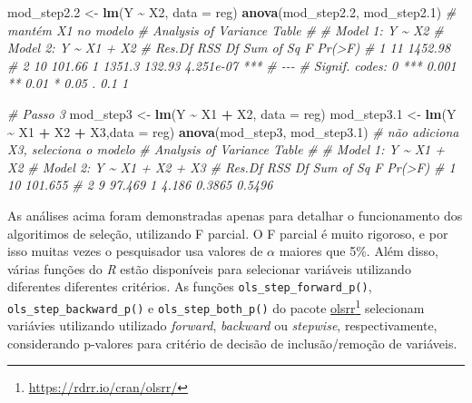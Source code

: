 \documentclass[
]{book}
\newenvironment{Shaded}{\begin{snugshade}}{\end{snugshade}}
\newcommand{\CommentTok}[1]{\textcolor[rgb]{0.56,0.35,0.01}{\textit{#1}}}
\newcommand{\DataTypeTok}[1]{\textcolor[rgb]{0.13,0.29,0.53}{#1}}
\newcommand{\FloatTok}[1]{\textcolor[rgb]{0.00,0.00,0.81}{#1}}
\newcommand{\KeywordTok}[1]{\textcolor[rgb]{0.13,0.29,0.53}{\textbf{#1}}}
\newcommand{\NormalTok}[1]{#1}
\newcommand{\OperatorTok}[1]{\textcolor[rgb]{0.81,0.36,0.00}{\textbf{#1}}}
\newcommand{\StringTok}[1]{\textcolor[rgb]{0.31,0.60,0.02}{#1}}
\numberwithin{equation}{section}
\begin{document}
\begin{Shaded}
\begin{Highlighting}[]
\NormalTok{mod\_step2}\FloatTok{.2}\NormalTok{ \textless{}{-}}\StringTok{ }\KeywordTok{lm}\NormalTok{(Y }\OperatorTok{\textasciitilde{}}\StringTok{ }\NormalTok{X2, }\DataTypeTok{data =}\NormalTok{ reg)}
\KeywordTok{anova}\NormalTok{(mod\_step2}\FloatTok{.2}\NormalTok{, mod\_step2}\FloatTok{.1}\NormalTok{) }\CommentTok{\# mantém X1 no modelo}
\CommentTok{\# Analysis of Variance Table}
\CommentTok{\# }
\CommentTok{\# Model 1: Y \textasciitilde{} X2}
\CommentTok{\# Model 2: Y \textasciitilde{} X1 + X2}
\CommentTok{\#   Res.Df     RSS Df Sum of Sq      F    Pr(\textgreater{}F)    }
\CommentTok{\# 1     11 1452.98                                  }
\CommentTok{\# 2     10  101.66  1    1351.3 132.93 4.251e{-}07 ***}
\CommentTok{\# {-}{-}{-}}
\CommentTok{\# Signif. codes:  0 \textquotesingle{}***\textquotesingle{} 0.001 \textquotesingle{}**\textquotesingle{} 0.01 \textquotesingle{}*\textquotesingle{} 0.05 \textquotesingle{}.\textquotesingle{} 0.1 \textquotesingle{} \textquotesingle{} 1}

\CommentTok{\# Passo 3}
\NormalTok{mod\_step3 \textless{}{-}}\StringTok{ }\KeywordTok{lm}\NormalTok{(Y }\OperatorTok{\textasciitilde{}}\StringTok{ }\NormalTok{X1 }\OperatorTok{+}\StringTok{ }\NormalTok{X2, }\DataTypeTok{data =}\NormalTok{ reg)}
\NormalTok{mod\_step3}\FloatTok{.1}\NormalTok{ \textless{}{-}}\StringTok{ }\KeywordTok{lm}\NormalTok{(Y }\OperatorTok{\textasciitilde{}}\StringTok{ }\NormalTok{X1 }\OperatorTok{+}\StringTok{ }\NormalTok{X2 }\OperatorTok{+}\StringTok{ }\NormalTok{X3,}\DataTypeTok{data =}\NormalTok{ reg)}
\KeywordTok{anova}\NormalTok{(mod\_step3, mod\_step3}\FloatTok{.1}\NormalTok{) }\CommentTok{\# não adiciona X3, seleciona o modelo}
\CommentTok{\# Analysis of Variance Table}
\CommentTok{\# }
\CommentTok{\# Model 1: Y \textasciitilde{} X1 + X2}
\CommentTok{\# Model 2: Y \textasciitilde{} X1 + X2 + X3}
\CommentTok{\#   Res.Df     RSS Df Sum of Sq      F Pr(\textgreater{}F)}
\CommentTok{\# 1     10 101.655                           }
\CommentTok{\# 2      9  97.469  1     4.186 0.3865 0.5496}
\end{Highlighting}
\end{Shaded}

As análises acima foram demonstradas apenas para detalhar o funcionamento dos algoritimos de seleção, utilizando F parcial. O F parcial é muito rigoroso, e por isso muitas vezes o pesquisador usa valores de \(\alpha\) maiores que 5\%. Além disso, várias funções do \emph{R} estão disponíveis para selecionar variáveis utilizando diferentes diferentes critérios. As funções \texttt{ols\_step\_forward\_p()}, \texttt{ols\_step\_backward\_p()} e \texttt{ols\_step\_both\_p()} do pacote \href{https://rdrr.io/cran/olsrr/}{olsrr}\footnote{\url{https://rdrr.io/cran/olsrr/}} selecionam variávies utilizando utilizado \emph{forward}, \emph{backward} ou \emph{stepwise}, respectivamente, considerando p-valores para critério de decisão de inclusão/remoção de variáveis.
\end{document}
